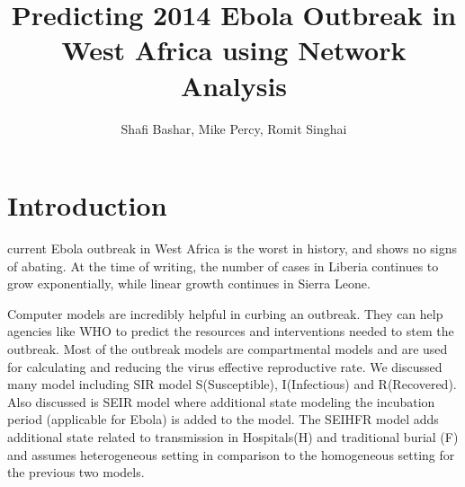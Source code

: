 \documentclass[12pt, journal,onecolumn]{IEEEtran}
\title{Predicting 2014 Ebola Outbreak in West Africa using Network Analysis}
\author{Shafi Bashar, Mike Percy, Romit  Singhai}
\affil{\textit {\{shafiab, mp81, romit\}@stanford.edu}}
\begin{document}
\maketitle

%



\section{Introduction}
\label{sec:introduction}

\bigskip
{} current Ebola outbreak in West Africa is the worst in history, and shows no signs
of abating. At the time of writing, the number of cases in Liberia continues to grow exponentially,
while linear growth continues in Sierra Leone.



Computer models are incredibly helpful in curbing an outbreak. They can help agencies like WHO to predict the resources and interventions needed
to stem the outbreak. Most of the outbreak models  are compartmental models and are used  for calculating and reducing the virus effective reproductive rate.
We discussed many model including SIR model S(Susceptible), I(Infectious) and R(Recovered). Also discussed is SEIR model where additional state modeling the incubation 
period (applicable for Ebola) is added to the model. The SEIHFR model adds additional state related to transmission in Hospitals(H) and traditional burial (F) and assumes 
heterogeneous setting in comparison to the homogeneous setting for the previous two models. 
\end{document}
